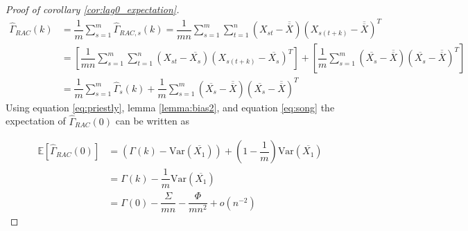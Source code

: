 \documentclass[12pt]{article}
\newcommand{\Var}{\text{Var}}
\begin{document}
\begin{proof}[Proof of corollary \ref{cor:lag0_expectation}]

\begin{align*}
    \hat{\Gamma}_{RAC}(k) &= \dfrac{1}{m}\sum_{s=1}^{m}\hat{\Gamma}_{RAC,s}(k) = \dfrac{1}{mn}\sum_{s=1}^{m}\sum_{t=1}^{n}(X_{st}-\overline{\overline{X}})(X_{s(t+k)}-\overline{\overline{X}})^T\\
    &= \left[\dfrac{1}{mn}\sum_{s=1}^{m}\sum_{t=1}^{n}(X_{st}-\overline{X_s})(X_{s(t+k)}-\overline{X_s})^T\right] + \left[\dfrac{1}{m}\sum_{s=1}^{m}(\overline{X_s}-\overline{\overline{X}})(\overline{X_s}-\overline{\overline{X}})^T\right]\\
    &= \dfrac{1}{m}\sum_{s=1}^{m}\hat{\Gamma}_s(k)  + \dfrac{1}{m}\sum_{s=1}^{m}(\overline{X_s}-\overline{\overline{X}})(\overline{X_s}-\overline{\overline{X}})^T
\end{align*}
Using equation \ref{eq:priestly}, lemma \ref{lemma:bias2}, and equation \ref{eq:song} the expectation of $\hat{\Gamma}_{RAC}(0)$ can be written as 

\begin{align*}
    \mathbb{E}[\hat{\Gamma}_{RAC}(0)] &= \left(\Gamma(k) - \Var(\overline{X_1})\right) + \left(1-\dfrac{1}{m}\right)\Var(\overline{X_1})\\
    &= \Gamma(k) - \dfrac{1}{m}\Var(\overline{X_1})\\
    &= \Gamma(0) - \dfrac{\Sigma}{mn} - \dfrac{\Phi}{mn^2} + o(n^{-2})
\end{align*}

\end{proof}
\end{document}
